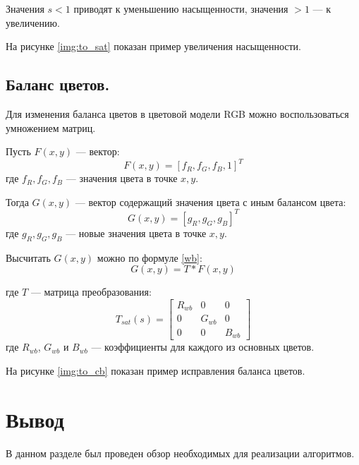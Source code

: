 Значения $s < 1$ приводят к уменьшению насыщенности, значения $> 1$ --- к увеличению. \cite{sat}

На рисунке \ref{img:to_sat} показан пример увеличения насыщенности.


\subsection{Баланс цветов.}

Для изменения баланса цветов в цветовой модели RGB можно воспользоваться умножением матриц.

Пусть $F(x,y)$ --- вектор:
\begin{equation}
	\label{F}
	F(x,y) = [f_R, f_G, f_B, 1]^T
\end{equation}
где $f_R, f_G, f_B$ --- значения цвета в точке $x,y$.

Тогда $G(x,y)$ --- вектор содержащий значения цвета с иным балансом цвета:
\begin{equation}
	\label{G}
	G(x,y) = [g_R, g_G, g_B]^T
\end{equation}
где $g_R, g_G, g_B$ --- новые значения цвета в точке $x,y$.

Высчитать $G(x,y)$ можно по формуле \ref{wb}:
\begin{equation}
	\label{wb}
	G(x,y) = T * F(x,y)
\end{equation}

где $T$ --- матрица преобразования:
\begin{equation}
	\label{twb}
	T_{sat}(s) = \begin{bmatrix}
		R_{wb} & 0 & 0 \\
		0 & G_{wb} & 0 \\ 
		0 & 0 & B_{wb} 
	\end{bmatrix}
\end{equation}
где $R_{wb}$, $G_{wb}$ и $B_{wb}$ --- коэффициенты для каждого из основных цветов.

На рисунке \ref{img:to_cb} показан пример исправления баланса цветов.


\section*{Вывод}
В данном разделе был проведен обзор необходимых для реализации алгоритмов.